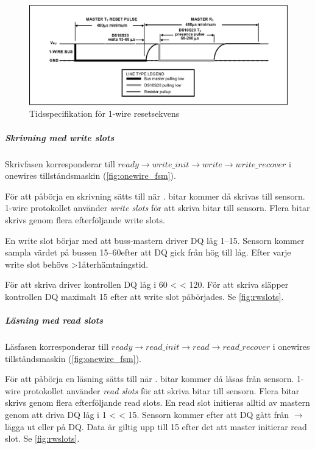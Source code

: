 \begin{figure}[H]
	\centering
	\includegraphics[width=\textwidth]{reset_presence.eps}
	\caption{Tidsspecifikation för 1-wire resetsekvens}
	\label{fig:ow_timings}
\end{figure}


\subparagraph{Skrivning med \emph{write slots}}
Skrivfasen korresponderar till $ready\rightarrow write\_init\rightarrow write\rightarrow write\_recover$ i onewires tillståndsmaskin (\autoref{fig:onewire_fsm}).

För att påbörja en skrivning sätts  till  när .
 bitar kommer då skrivas till sensorn.
1-wire protokollet använder \emph{write slots} för att skriva bitar till sensorn. Flera bitar skrivs genom flera efterföljande write slots.

En write slot börjar med att buss-mastern driver DQ låg 1--15\us. Sensorn kommer sampla värdet på bussen 15--60\us efter att DQ gick från hög till låg. Efter varje write slot behövs >1\us återhämtningstid.

För att skriva \low{} driver kontrollen DQ låg i 60\us{} < \Tx{} < 120\us{}.
För att skriva \high{} släpper kontrollen DQ maximalt 15\us{} efter att write slot påbörjades.
Se \autoref{fig:rwslots}.


\subparagraph{Läsning med \emph{read slots}}
Läsfasen korresponderar till $ready\rightarrow read\_init\rightarrow read\rightarrow read\_recover$ i onewires tillståndsmaskin (\autoref{fig:onewire_fsm}).

För att påbörja en läsning sätts  till  när .
 bitar kommer då läsas från sensorn.
1-wire protokollet använder \emph{read slots} för att skriva bitar till sensorn. Flera bitar skrivs genom flera efterföljande read slots.
En read slot initieras alltid av mastern genom att driva DQ låg i 1\us{} < \Tx{} < 15\us{}. Sensorn kommer efter att DQ gått från \high{} $\rightarrow$ \low{} lägga ut \high{} eller \low{} på DQ. Data är giltig upp till 15\us{} efter det att master initierar read slot.
Se \autoref{fig:rwslots}.



